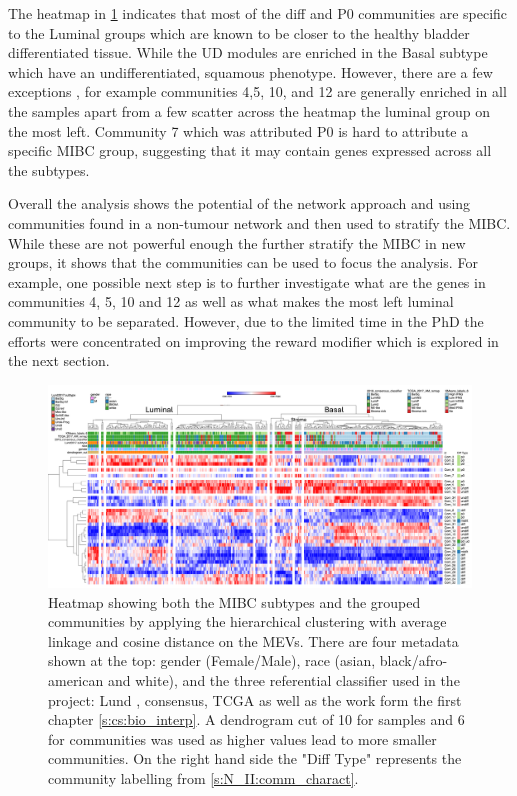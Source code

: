 The heatmap in \cref{fig:N_II:tum_morph} indicates that most of the diff and P0 communities are specific to the Luminal groups which are known to be closer to the healthy bladder differentiated tissue. While the UD modules are enriched in the Basal subtype which have an undifferentiated, squamous phenotype. However, there are a few exceptions , for example communities 4,5, 10, and 12 are generally enriched in all the samples apart from a few scatter across the heatmap the luminal group on the most left. Community 7 which was attributed P0 is hard to attribute a specific MIBC group, suggesting that it may contain genes expressed across all the subtypes.

Overall the analysis shows the potential of the network approach and using communities found in a non-tumour network and then used to stratify the MIBC. While these are not powerful enough the further stratify the MIBC in new groups, it shows that the communities can be used to focus the analysis. For example, one possible next step is to further investigate what are the genes in communities 4, 5, 10 and 12 as well as what makes the most left luminal community to be separated. However, due to the limited time in the PhD the efforts were concentrated on improving the reward modifier which is explored in the next section.


\begin{figure}[H]    
    \centering
    \includegraphics[width=1.0\textwidth,height=1.0\textheight,keepaspectratio]{Sections/Network_II/resources/non_tum/iMev_3_3_cs_13.png}
    \caption{Heatmap showing both the MIBC subtypes and the grouped communities by applying the hierarchical clustering with average linkage and cosine distance on the MEVs. There are four metadata shown at the top: gender (Female/Male), race (asian, black/afro-american and white), and the three referential classifier used in the project: Lund \citet{Marzouka2018-ge}, consensus\citet{Kamoun2020-tj}, TCGA \citet{Robertson2017-mg} as well as the work form the first chapter \cref{s:cs:bio_interp}. A dendrogram cut of 10 for samples and 6 for communities was used as higher values lead to more smaller communities. On the right hand side the "Diff Type" represents the community labelling from \cref{s:N_II:comm_charact}.}
    \label{fig:N_II:tum_morph}
\end{figure}



